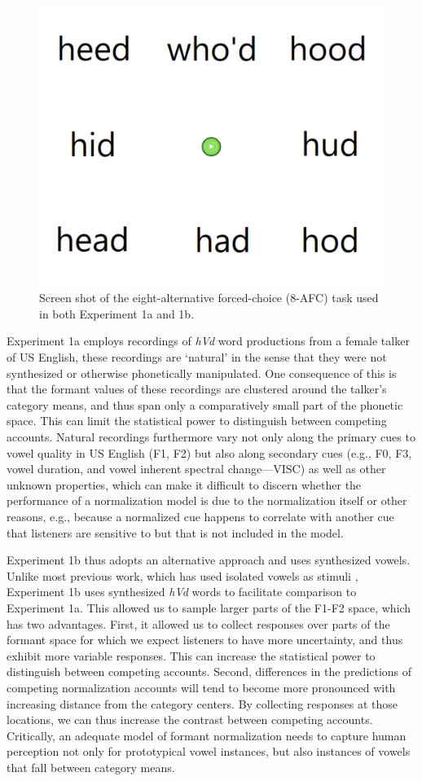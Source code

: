 \documentclass[preprint]{JASA}
\begin{document}
\begin{figure}

{\centering \includegraphics[width=0.4\linewidth]{figures/response-grid} 

}

\caption{Screen shot of the eight-alternative forced-choice (8-AFC) task used in both Experiment 1a and 1b.}\label{fig:exp-procedure}
\end{figure}

Experiment 1a employs recordings of \emph{hVd} word productions from a female talker of US English, these recordings are `natural' in the sense that they were not synthesized or otherwise phonetically manipulated. One consequence of this is that the formant values of these recordings are clustered around the talker's category means, and thus span only a comparatively small part of the phonetic space. This can limit the statistical power to distinguish between competing accounts. Natural recordings furthermore vary not only along the primary cues to vowel quality in US English (F1, F2) but also along secondary cues (e.g., F0, F3, vowel duration, and vowel inherent spectral change---VISC) as well as other unknown properties, which can make it difficult to discern whether the performance of a normalization model is due to the normalization itself or other reasons, e.g., because a normalized cue happens to correlate with another cue that listeners are sensitive to but that is not included in the model.

Experiment 1b thus adopts an alternative approach and uses synthesized vowels. Unlike most previous work, which has used isolated vowels as stimuli \citep{barreda-nearey2012, barreda2021, nearey1989, richter2017}, Experiment 1b uses synthesized \emph{hVd} words to facilitate comparison to Experiment 1a. This allowed us to sample larger parts of the F1-F2 space, which has two advantages. First, it allowed us to collect responses over parts of the formant space for which we expect listeners to have more uncertainty, and thus exhibit more variable responses. This can increase the statistical power to distinguish between competing accounts. Second, differences in the predictions of competing normalization accounts will tend to become more pronounced with increasing distance from the category centers. By collecting responses at those locations, we can thus increase the contrast between competing accounts. Critically, an adequate model of formant normalization needs to capture human perception not only for prototypical vowel instances, but also instances of vowels that fall between category means.
\end{document}
